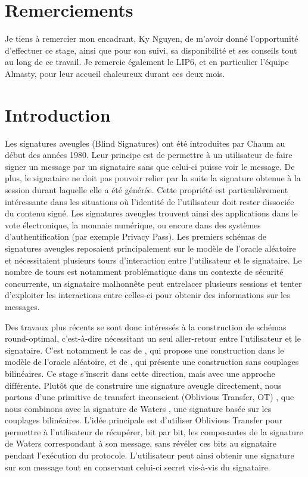 \documentclass[10pt,a4paper]{article}
\theoremstyle{definition}
\theoremstyle{plain}
\theoremstyle{remark}
\begin{document}
\newpage
\tableofcontents
\newpage

\section*{Remerciements}

Je tiens à remercier mon encadrant, Ky Nguyen, de m'avoir donné l'opportunité
d'effectuer ce stage, ainsi que pour son suivi, sa disponibilité et ses
conseils tout au long de ce travail.
Je remercie également le LIP6, et en particulier l'équipe Almasty,
pour leur accueil chaleureux durant ces deux mois.

\section{Introduction}

Les signatures aveugles (Blind Signatures) ont été introduites par
Chaum \cite{chaum1982,chaum1983} au début des années 1980. Leur principe
est de permettre à un utilisateur de faire signer un message par un
signataire sans que celui-ci puisse voir le message. De plus, le
signataire ne doit pas pouvoir relier par la suite la signature obtenue
à la session durant laquelle elle a été générée.
Cette propriété est particulièrement intéressante dans les situations
où l'identité de l'utilisateur doit rester dissociée du contenu signé.
Les signatures aveugles trouvent ainsi des applications dans le vote
électronique, la monnaie numérique, ou encore dans des systèmes
d'authentification (par exemple Privacy Pass).
Les premiers schémas de signatures aveugles reposaient principalement
sur le modèle de l'oracle aléatoire et nécessitaient plusieurs tours
d'interaction entre l'utilisateur et le signataire. Le nombre de tours
est notamment problématique dans un contexte de sécurité concurrente,
un signataire malhonnête peut entrelacer plusieurs sessions et tenter
d'exploiter les interactions entre celles-ci pour obtenir des
informations sur les messages.

Des travaux plus récents se sont donc intéressés à la construction de
schémas round-optimal, c'est-à-dire nécessitant un seul aller-retour
entre l'utilisateur et le signataire. C'est notamment le cas de
\cite{krs2023}, qui propose une construction dans le modèle de
l'oracle aléatoire, et de \cite{knr2024}, qui présente une construction
sans couplages bilinéaires.
Ce stage s'inscrit dans cette direction, mais avec une approche
différente. Plutôt que de construire une signature aveugle directement,
nous partons d'une primitive de transfert inconscient (Oblivious
Transfer, OT) \cite{rabin1981}, que nous combinons avec la signature de
Waters \cite{waters2005}, une signature basée sur les couplages
bilinéaires.
L'idée principale est d'utiliser Oblivious Transfer pour permettre à l'utilisateur
de récupérer, bit par bit, les composantes de la signature de Waters
correspondant à son message, sans révéler ces bits au signataire
pendant l'exécution du protocole. L'utilisateur peut ainsi obtenir une
signature sur son message tout en conservant celui-ci secret vis-à-vis
du signataire.
\end{document}
